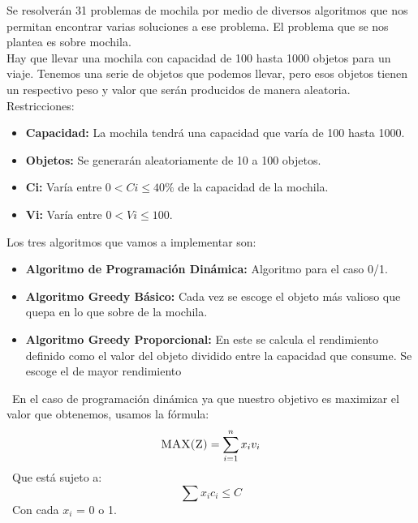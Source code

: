 \documentclass[10pt,letterpaper]{article}
\begin{document}
 \newline \newline 
Se resolverán 31 problemas de mochila por medio de diversos algoritmos que nos 
        permitan encontrar varias soluciones a ese problema. 
        El problema que se nos plantea es sobre mochila. \\ 
        Hay que llevar una mochila con capacidad de 100 hasta 1000 objetos para un viaje. 
        Tenemos una serie de objetos que podemos llevar, pero esos objetos tienen un respectivo peso 
        y valor que serán producidos de manera aleatoria. \ \ \newline \newline 
        Restricciones: 
        \begin{itemize} 
        \item \textbf{Capacidad:} La mochila tendrá una capacidad que varía de 100 hasta 1000. 
        \item \textbf{Objetos:} Se generarán aleatoriamente de 10 a 100 objetos. 
        \item \textbf{C{i}:} Varía entre $0 < C{i} \leq 40\%$ de la capacidad de la mochila. 
        \item \textbf{V{i}:} Varía entre $0 < V{i} \leq 100$. 
        \end{itemize} 
        Los tres algoritmos que vamos a implementar son: 
        \begin{itemize} 
        \item \textbf{Algoritmo de Programación Dinámica:} Algoritmo para el caso 0/1. 
        \item \textbf{Algoritmo Greedy Básico:} Cada vez se escoge el objeto más 
         valioso que quepa en lo que sobre de la mochila. 
        \item \textbf{Algoritmo Greedy Proporcional:} En este se calcula el rendimiento definido 
        como el valor del objeto dividido entre la capacidad que consume. Se escoge el de mayor rendimiento 
        \end{itemize} 
        \ En el caso de programación dinámica ya que nuestro objetivo es maximizar el valor que obtenemos, usamos la fórmula: 
        \[ \textsc{\normalsize MAX(Z)}\\[0.5cm] = \sum_{i=1}^{n}x_{i}v_{i} \] 
        \ Que está sujeto a:  
        \[ \sum x_{i}c_{i} \leq C \] 
        \ Con cada $x_{i}$ = 0 o 1.  
        \ \ \newline \newline 
        
\end{document}

